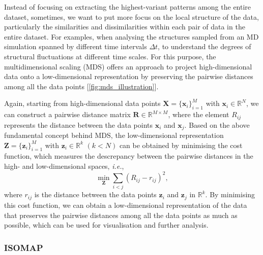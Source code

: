 Instead of focusing on extracting the highest-variant patterns among the entire dataset, sometimes, we want to put more focus on the local structure of the data, particularly the similarities and dissimilarities within each pair of data in the entire dataset. For examples, when analysing the structures sampled from an MD simulation spanned by different time intervals $\Delta t$, to understand the degrees of structural fluctuations at different time scales. For this purpose, the multidimensional scaling (MDS)\cite{borg2005modern} offers an approach to project high-dimensional data onto a low-dimensional representation by preserving the pairwise distances among all the data points [\cref{fig:mds_illustration}].

Again, starting from high-dimensional data points $\bm{X}=\{\bm{x}_i\}_{i=1}^M$ with $\bm{x}_i \in \mathbb{R}^N$, we can construct a pairwise distance matrix $\bm{R}\in\mathbb{R}^{M\times M}$, where the element $R_{ij}$ represents the distance between the data points $\bm{x}_i$ and $\bm{x}_j$. Based on the above fundamental concept behind MDS, the low-dimensional representation $\bm{Z}=\{\bm{z}_i\}_{i=1}^M$ with $\bm{z}_i \in \mathbb{R}^k$ $(k<N)$ can be obtained by minimising the cost function, which measures the descrepancy between the pairwise distances in the high- and low-dimensional spaces, \emph{i.e.}, 
\begin{equation}
  \label{eq:MDS_minimisation}
  \min_{\bm{Z}} \sum_{i<j} (R_{ij}-r_{ij})^2,
\end{equation}
 where $r_{ij}$ is the distance between the data points $\bm{z}_i$ and $\bm{z}_j$ in $\mathbb{R}^{k}$. By minimising this cost function, we can obtain a low-dimensional representation of the data that preserves the pairwise distances among all the data points as much as possible, which can be used for visualisation and further analysis. 




\subsubsection{ISOMAP}
\label{appendix:isomap}

